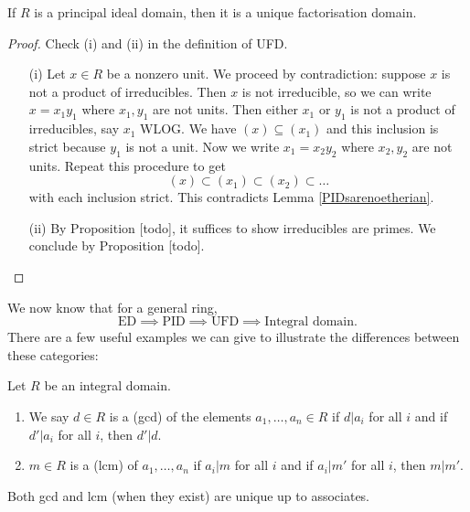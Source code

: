 \documentclass[egregdoesnotlikesansseriftitles,a4paper]{scrartcl}
\begin{document}
\begin{theorem}
       If $R$ is a principal ideal domain, then it is a unique factorisation domain.
       \begin{proof}
            Check (i) and (ii) in the definition of UFD.
            \begin{itemize}
                  \item[(i)] Let $ x \in R$ be a nonzero unit. We proceed by contradiction: suppose $x$ is not a product of irreducibles. Then $x $ is not irreducible, so we can write $x= x_1 y_1 $ where $x_1 ,y_1 $ are not units. Then either $x_1 $ or $y_1$ is not a product of irreducibles, say $x_1 $ WLOG. We have $(x)\subseteq (x_1 )$ and this inclusion is strict because $y_1 $ is not a unit.
                  Now we write $x_1 =x_2 y_2 $ where $x_2 , y_2 $ are not units. Repeat this procedure to get \[
                  (x)\subset (x_1 )\subset (x_2 ) \subset \ldots 
                  \] with each inclusion strict. This contradicts Lemma \ref{PIDsarenoetherian}.
                  \item[(ii)] By Proposition [todo], it suffices to show irreducibles are primes. We conclude by Proposition [todo].
            \end{itemize}
     \end{proof}
\end{theorem}
\begin{remark}
       We now know that for a general ring, \[
       \text{ED} \implies \text{PID} \implies \text{UFD} \implies \text{Integral domain} 
       .\] There are a few useful examples we can give to illustrate the differences between these categories:
\end{remark}
\begin{definition*}
       Let $R$ be an integral domain.
       \begin{enumerate}
             \item We say $d \in R$ is a  (gcd) of the elements $a_1 , \ldots, a_n \in R$ if $d|a_{i}$ for all $i$ and if $d' | a_i$ for all $i$, then $d' |d$.
             \item $m \in R$ is a  (lcm) of $a_1 ,\ldots ,a_n$ if $a_{i}|m$ for all $i$ and if $a_i| m'$ for all $i$, then $m|m'$.
       \end{enumerate}
       Both gcd and lcm (when they exist) are unique up to associates.
\end{definition*}
\end{document}
